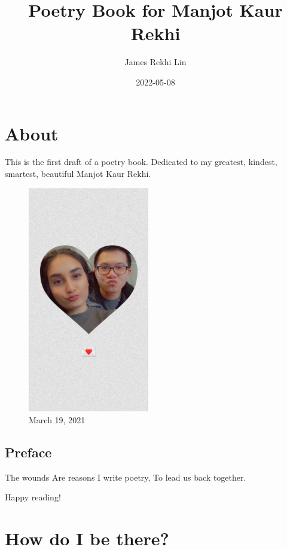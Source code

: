 \documentclass[
]{book}
\title{Poetry Book for Manjot Kaur Rekhi}
\author{James Rekhi Lin}
\date{2022-05-08}
\newenvironment{Shaded}{\begin{snugshade}}{\end{snugshade}}
\newcommand{\NormalTok}[1]{#1}
\begin{document}
\maketitle

{
\setcounter{tocdepth}{1}
\tableofcontents
}
\hypertarget{about}{%
\chapter{About}\label{about}}

This is the first draft of a poetry book. Dedicated to my greatest, kindest, smartest, beautiful Manjot Kaur Rekhi.

\begin{figure}
\centering
\includegraphics[width=2.08333in,height=\textheight]{mimages/18 3-19-2021.jpg}
\caption{March 19, 2021}
\end{figure}

\hypertarget{preface}{%
\section{Preface}\label{preface}}

\begin{Shaded}
\begin{Highlighting}[]
\NormalTok{The wounds }
\NormalTok{Are reasons }
\NormalTok{I write poetry,}
\NormalTok{To lead us }
\NormalTok{back together.}
\end{Highlighting}
\end{Shaded}

Happy reading!

\hypertarget{how-do-i-be-there}{%
\chapter{How do I be there?}\label{how-do-i-be-there}}
\end{document}
